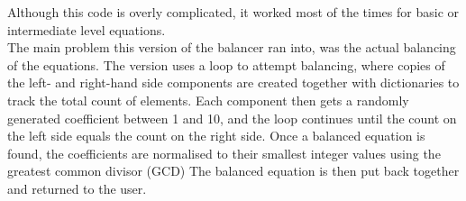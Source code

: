 \documentclass[a4paper,12pt]{article}
\begin{document}
Although this code is overly complicated, it worked most of the times for basic or intermediate level equations.\\
The main problem this version of the balancer ran into, was the actual balancing of the equations. The version uses a loop to attempt balancing, where copies of the left- and right-hand side components are created together with dictionaries to track the total count of elements. Each component then gets a randomly generated coefficient between 1 and 10, and the loop continues until the count on the left side equals the count on the right side. Once a balanced equation is found, the coefficients are normalised to their smallest integer values using the greatest common divisor (GCD) The balanced equation is then put back together and returned to the user.\\
\end{document}
